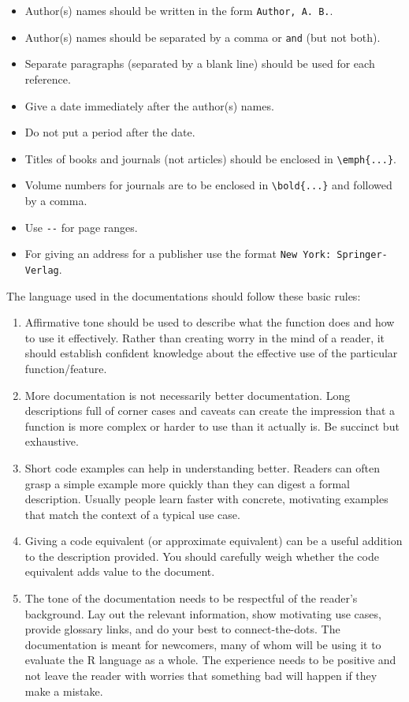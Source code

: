\documentclass[
]{book}
\providecommand{\tightlist}{%
  \setlength{\itemsep}{0pt}\setlength{\parskip}{0pt}}
\begin{document}
\begin{enumerate}
  \begin{itemize}
  \tightlist
  \item
    Author(s) names should be written in the form \texttt{Author,\ A.\ B.}.
  \item
    Author(s) names should be separated by a comma or \texttt{and} (but not both).
  \item
    Separate paragraphs (separated by a blank line) should be used for each reference.
  \item
    Give a date immediately after the author(s) names.
  \item
    Do not put a period after the date.
  \item
    Titles of books and journals (not articles) should be enclosed in \texttt{\textbackslash{}emph\{...\}}.
  \item
    Volume numbers for journals are to be enclosed in \texttt{\textbackslash{}bold\{...\}} and followed by a comma.
  \item
    Use \texttt{-\/-} for page ranges.
  \item
    For giving an address for a publisher use the format \texttt{New\ York:\ Springer-Verlag}.
  \end{itemize}
\end{enumerate}

The language used in the documentations should follow these basic rules:

\begin{enumerate}
\def\labelenumi{\arabic{enumi}.}
\item
  Affirmative tone should be used to describe what the function does and how to use it effectively. Rather than creating worry in the mind of a reader, it should establish confident knowledge about the effective use of the particular function/feature.
\item
  More documentation is not necessarily better documentation. Long descriptions full of corner cases and caveats can create the impression that a function is more complex or harder to use than it actually is. Be succinct but exhaustive.
\item
  Short code examples can help in understanding better. Readers can often grasp a simple example more quickly than they can digest a formal description. Usually people learn faster with concrete, motivating examples that match the context of a typical use case.
\item
  Giving a code equivalent (or approximate equivalent) can be a useful addition to the description provided. You should carefully weigh whether the code equivalent adds value to the document.
\item
  The tone of the documentation needs to be respectful of the reader's background. Lay out the relevant information, show motivating use cases, provide glossary links, and do your best to connect-the-dots. The documentation is meant for newcomers, many of whom will be using it to evaluate the R language as a whole. The experience needs to be positive and not leave the reader with worries that something bad will happen if they make a mistake.
\end{enumerate}
\end{document}
